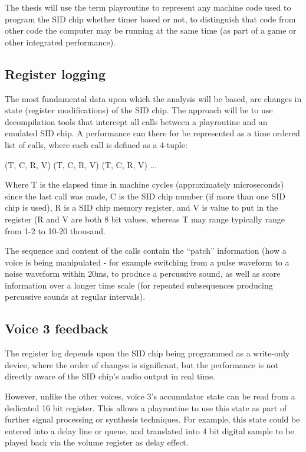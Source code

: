 \documentclass[10pt]{article}
\begin{document}
\begin{multicols*}{2}
  The thesis will use the term playroutine to represent any machine
  code used to program the SID chip whether timer based or not, to
  distinguish that code from other code the computer may be running at
  the same time (as part of a game or other integrated performance).

  \subsection{Register logging}
  The most fundamental data upon which the analysis will be based,
  are changes in state (register modifications) of the SID chip. The
  approach will be to use decompilation tools that intercept all calls
  between a playroutine and an emulated SID chip. A performance can
  there for be represented as a time ordered list of calls, where each
  call is defined as a 4-tuple:

  (T, C, R, V)
  (T, C, R, V)
  (T, C, R, V)
  ...

  Where T is the elapsed time in machine cycles (approximately
  microseconds) since the last call was made, C is the SID chip number
  (if more than one SID chip is used), R is a SID chip memory
  register, and V is value to put in the register (R and V are both 8
  bit values, whereas T may range typically range from 1-2 to 10-20
  thousand.

  The sequence and content of the calls contain the ``patch''
  information (how a voice is being manipulated - for example
  switching from a pulse waveform to a noise waveform within 20ms, to
  produce a percussive sound, as well as score information over a
  longer time scale (for repeated subsequences producing percussive
  sounds at regular intervals).

  \subsection{Voice 3 feedback}
  The register log depends upon the SID chip being programmed as a
  write-only device, where the order of changes is significant, but
  the performance is not directly aware of the SID chip's audio output
  in real time.

  However, unlike the other voices, voice 3's accumulator state can be
  read from a dedicated 16 bit register. This allows a playroutine to use
  this state as part of further signal processing or synthesis
  techniques. For example, this state could be entered into a delay
  line or queue, and translated into 4 bit digital sample to be played
  back via the volume register as delay effect.


\end{multicols*}
\end{document}
